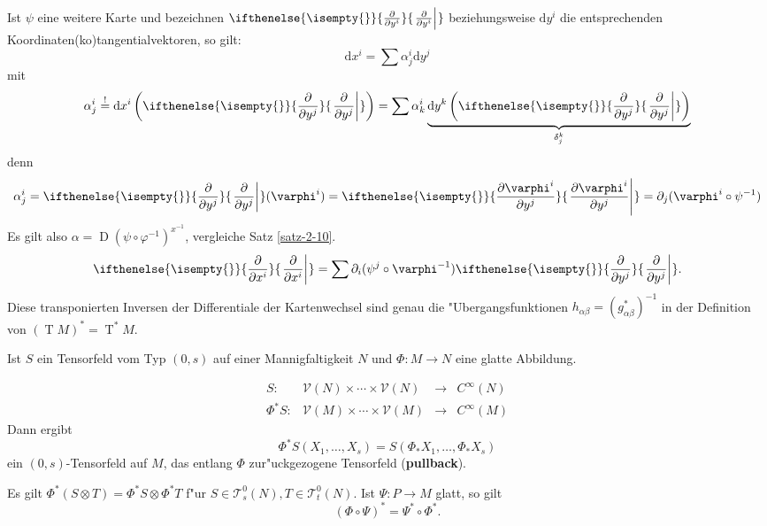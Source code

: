 \documentclass[paper=A4, twoside, chapterprefix=true, bibliography=totoc, headsepline]{scrbook}
\let\temp\phi
\let\phi\varphi
\let\varphi\temp
\let\temp\theta
\let\theta\vartheta
\let\vartheta\temp
\let\temp\epsilon
\let\epsilon\varepsilon
\let\varepsilon\temp
\let\temp\rho
\let\rho\varrho
\let\varrho\temp
\DeclareMathOperator{\calT}{\mathcal{T}}
\DeclareMathOperator{\D}{D} %
\DeclareMathOperator{\T}{T} %
\newcommand{\dop}{\mathrm{d}}
\newcommand{\X}{\times}
\newcommand{\pdifffrac}[3][]{\ifthenelse{\isempty{#1}}{\frac{\partial #2}{\partial #3}}{\left. \frac{\partial #2}{\partial #3} \right|_{#1}}}
\theoremstyle{plain}
\theoremstyle{nonumberplain}
\theoremstyle{empty}
\theoremstyle{break}
\newcommand{\CmIndex}[2][]{\ifthenelse{\isempty{#1}}{\index{#2}}{\index{#1}}#2}
\newcommand{\CmMark}[2][]{\textbf{\CmIndex[#1]{#2}}}
\begin{document}
Ist $\psi$ eine weitere Karte und bezeichnen $\pdifffrac{}{y^i}$ beziehungsweise $\dop y^i$ die entsprechenden Koordinaten(ko)tangentialvektoren, so gilt:
	\[ \dop x^i = \sum \alpha_j^i\dop y^j \]
mit
	\[ \alpha_j^i \overset{!}{=} \dop x^i\left(\pdifffrac{}{y^j}\right) = \sum \alpha_k^i \underbrace{\dop y^k\left(\pdifffrac{}{y^j}\right)}_{\delta_j^k} \]
denn
	\[ \alpha_j^i = \pdifffrac{}{y^j}(\phi^i) = \pdifffrac{\phi^i}{y^j} = \partial_j(\phi^i\circ \psi^{-1}) \]
Es gilt also $\alpha = \D(\psi \circ \phi^{-1})^{x^{-1}}$, vergleiche Satz \ref{satz-2-10}.
\begin{align*}
  \pdifffrac{}{x^i} = \sum \partial_i (\psi^j \circ \phi^{-1})\pdifffrac{}{y^j}.
\end{align*}
Diese transponierten Inversen der Differentiale der Kartenwechsel sind genau die "Ubergangsfunktionen $h_{\alpha\beta} = (g_{\alpha\beta}^{*})^{-1}$ in der Definition von $(\T M)^{*} = \T^{*}M$.

Ist $S$ ein Tensorfeld vom Typ $(0,s)$ auf einer Mannigfaltigkeit $N$ und $\Phi \colon M \to N$ eine glatte Abbildung.
\begin{center}\end{center}
	\[ \begin{array}{rccc} S \colon & \mathcal V(N) \X \cdots \X \mathcal V(N) &\to& C^{\infty}(N)\\
		\Phi^{*}S \colon & \mathcal V(M) \X \cdots \X \mathcal V(M) &\to& C^{\infty}(M) \end{array} \]
Dann ergibt
	\[ \Phi^{*}S(X_{1},\ldots,X_{s}) = S(\Phi_{*}X_{1},\ldots,\Phi_{*}X_{s}) \]
ein $(0,s)$-Tensorfeld auf $M$, das entlang $\Phi$ zur"uckgezogene Tensorfeld (\CmMark{pullback}).

Es gilt $\Phi^{*}(S \otimes T) = \Phi^{*}S \otimes \Phi^{*}T$ f"ur $S \in \mathcal T_s^0(N), T \in \mathcal T_t^0(N)$.
Ist $\Psi \colon P \to M$ glatt, so gilt
	\[ (\Phi \circ \Psi)^{*} = \Psi^{*} \circ \Phi^{*}.\]
\end{document}
